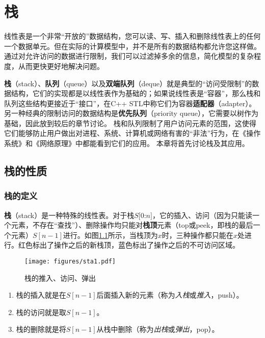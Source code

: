 

\chapter{栈}
线性表是一个非常“开放的”数据结构，您可以读、写、插入和删除线性表上的任何一个数据单元。但在实际的计算模型中，并不是所有的数据结构都允许您这样做。
通过对允许访问的数据进行限制，我们可以过滤掉多余的信息，简化模型的复杂程度，从而更快更好地解决问题。

\textbf{栈}（stack）、\textbf{队列}（queue）以及\textbf{双端队列}（deque）就是典型的“访问受限制”的数据结构，它们的实现都是以线性表作为基础的；如果说线性表是“容器”，那么栈和队列这些结构更接近于“接口”，在C++ STL中称它们为容器\textbf{适配器}（adapter）。另一种经典的限制访问的数据结构是\textbf{优先队列}（priority queue），它需要以树作为基础，因此放到较后的章节讨论。
栈和队列限制了用户访问元素的范围，这使得它们能够防止用户做出对进程、系统、计算机或网络有害的“非法”行为，在《操作系统》和《网络原理》中都能看到它们的应用。
本章将首先讨论栈及其应用。

\section{栈的性质}

\subsection{栈的定义}
\label{sta:栈的定义}
\textbf{栈}（stack）是一种特殊的线性表。对于栈$S[0$:$n]$，它的插入、访问（因为只能读一个元素，不存在“查找”）、删除操作均只能对\textbf{栈顶}元素（top或peek，即栈的最后一个元素）$S[n-1]$进行。如图\ref{fig:sta1}所示，当栈顶为$x$时，三种操作都只能在$x$处进行。红色标出了操作之后的新栈顶，蓝色标出了操作之后的不可访问区域。

\begin{figure}
  \centering
  \texttt{[image: figures/sta1.pdf]}
  \caption{栈的推入、访问、弹出}
  \label{fig:sta1}
\end{figure}

\begin{enumerate}
    \item 栈的插入就是在$S[n-1]$后面插入新的元素（称为\textit{入栈}或\textit{推入}，push）。
    \item 栈的访问就是取$S[n-1]$。
    \item 栈的删除就是将$S[n-1]$从栈中删除（称为\textit{出栈}或\textit{弹出}，pop）。
\end{enumerate}

